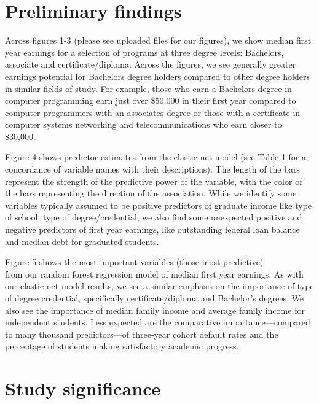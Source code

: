 \hypertarget{preliminary-findings}{%
\section{Preliminary findings}\label{preliminary-findings}}

Across figures 1-3 (please see uploaded files for our figures), we show
median first year earnings for a selection of programs at three degree
levels: Bachelors, associate and certificate/diploma. Across the
figures, we see generally greater earnings potential for Bachelors
degree holders compared to other degree holders in similar fields of
study. For example, those who earn a Bachelors degree in computer
programming earn just over \$50,000 in their first year compared to
computer programmers with an associates degree or those with a
certificate in computer systems networking and telecommunications who
earn closer to \$30,000.

Figure 4 shows predictor estimates from the elastic net model (see Table
1 for a concordance of variable names with their descriptions). The
length of the bars represent the strength of the predictive power of the
variable, with the color of the bars representing the direction of the
association. While we identify some variables typically assumed to be
positive predictors of graduate income like type of school, type of
degree/credential, we also find some unexpected positive and negative
predictors of first year earnings, like outstanding federal loan balance
and median debt for graduated students.

Figure 5 shows the most important variables (those most predictive)\\
from our random forest regression model of median first year earnings.
As with our elastic net model results, we see a similar emphasis on the
importance of type of degree credential, specifically
certificate/diploma and Bachelor's degrees. We also see the importance
of median family income and average family income for independent
students. Less expected are the comparative importance---compared to
many thousand predictors---of three-year cohort default rates and the
percentage of students making satisfactory academic progress.

\hypertarget{study-significance}{%
\section{Study significance}\label{study-significance}}

